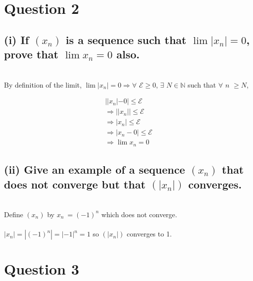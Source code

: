 \documentclass{article}
\begin{document}
\section*{Question 2}
\subsection*{(i) If \((x_n)\) is a sequence such that \(\lim|x_n| = 0\), prove that \(\lim x_n = 0\) also.}

\solution
\\
By definition of the limit, \(\lim|x_n| = 0 \Rightarrow \forall\) \(\mathcal{E} \geq 0\), \(\exists\) \(N \in \mathds{N}\) such that \(\forall\) \(n\) \(\geq N\),

\begin{align}
  \label{}
  ||x_n| - 0| \leq \mathcal{E} \nonumber \\
  \Rightarrow ||x_n|| \leq \mathcal{E} \nonumber \\
  \Rightarrow |x_n| \leq \mathcal{E} \nonumber \\
  \Rightarrow |x_n - 0| \leq \mathcal{E} \nonumber \\
  \Rightarrow \lim x_n = 0 \nonumber
\end{align}

\subsection*{(ii) Give an example of a sequence \((x_n)\) that does not converge but that \((|x_n|)\) converges.}
\solution
\\
Define \((x_n)\) by \(x_n\ = (-1)^n\) which does not converge.
\\
\\
\(|x_n| = |(-1)^n| = |-1|^n = 1\) so \((|x_n|)\) converges to 1.

\section*{Question 3}
\end{document}
